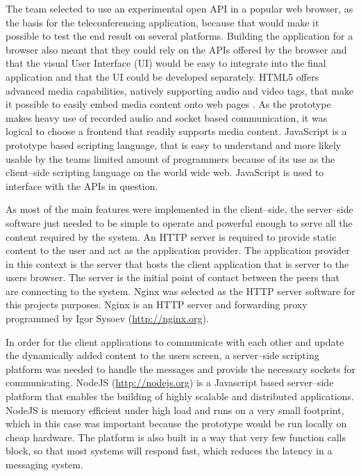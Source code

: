 \documentclass[english,12pt,a4paper,dvips]{article}
\begin{document}
The team selected to use an experimental open API in a popular web browser, as the basis for the teleconferencing application, because that would make it possible to test the end result on several platforms. Building the application for a browser also meant that they could rely on the APIs offered by the browser and that the visual User Interface (UI) would be easy to integrate into the final application and that the UI could be developed separately. HTML5 offers advanced media capabilities, natively supporting audio and video tags, that make it possible to easily embed media content onto web pages \cite{Meyn}. As the prototype makes heavy use of recorded audio and socket based communication, it was logical to choose a frontend that readily supports media content. JavaScript is a prototype based scripting language, that is easy to understand and more likely usable by the teams limited amount of programmers because of its use as the client--side scripting language on the world wide web. JavaScript is used to interface with the APIs in question.

As most of the main features were implemented in the client--side, the server--side software just needed to be simple to operate and powerful enough to serve all the content required by the system. An HTTP server is required to provide static content to the user and act as the application provider. The application provider in this context is the server that hosts the client application that is server to the users browser. The server is the initial point of contact between the peers that are connecting to the system. Nginx was selected as the HTTP server software for this projects purposes. Nginx is an HTTP server and forwarding proxy programmed by Igor Sysoev (\url{http://nginx.org}).

In order for the client applications to communicate with each other and update the dynamically added content to the users screen, a server--side scripting platform was needed to handle the messages and provide the necessary sockets for communicating. NodeJS (\url{http://nodejs.org}) is a Javascript based server--side platform that enables the building of highly scalable and distributed applications. NodeJS is memory efficient under high load and runs on a very small footprint, which in this case was important because the prototype would be run locally on cheap hardware. The platform is also built in a way that very few function calls block, so that most systems will respond fast, which reduces the latency in a messaging system.
\end{document}
